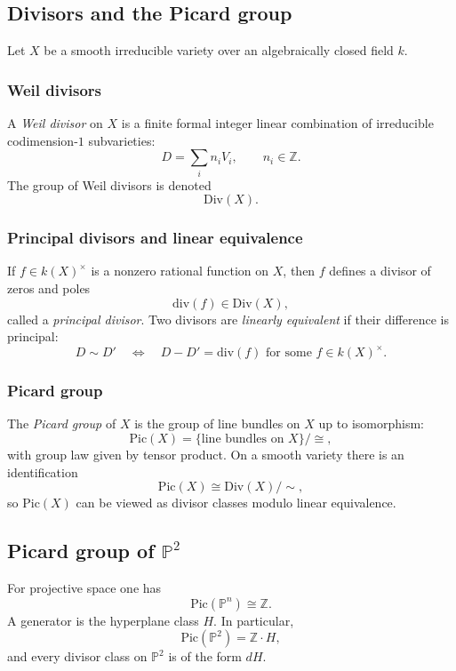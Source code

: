 \documentclass[12pt,a4paper]{article}
\theoremstyle{plain}
\theoremstyle{definition}      %
\begin{document}
\subsection*{Divisors and the Picard group}

Let $X$ be a smooth irreducible variety over an algebraically closed field $k$.

\subsubsection*{Weil divisors}

A \emph{Weil divisor} on $X$ is a finite formal integer linear combination of irreducible codimension-$1$ subvarieties:
\[
D=\sum_i n_i V_i,
\qquad
n_i\in \mathbb Z.
\]
The group of Weil divisors is denoted
\[
\mathrm{Div}(X).
\]

\subsubsection*{Principal divisors and linear equivalence}

If $f\in k(X)^\times$ is a nonzero rational function on $X$, then $f$ defines a divisor of zeros and poles
\[
\mathrm{div}(f)\in \mathrm{Div}(X),
\]
called a \emph{principal divisor}.
Two divisors are \emph{linearly equivalent} if their difference is principal:
\[
D\sim D'
\quad\Longleftrightarrow\quad
D-D'=\mathrm{div}(f)
\text{ for some } f\in k(X)^\times.
\]

\subsubsection*{Picard group}

The \emph{Picard group} of $X$ is the group of line bundles on $X$ up to isomorphism:
\[
\mathrm{Pic}(X)
=
\{\text{line bundles on }X\}/\cong,
\]
with group law given by tensor product.
On a smooth variety there is an identification
\[
\mathrm{Pic}(X)\cong \mathrm{Div}(X)\big/\sim,
\]
so $\mathrm{Pic}(X)$ can be viewed as divisor classes modulo linear equivalence.

\subsection*{Picard group of $\mathbb P^2$}

For projective space one has
\[
\mathrm{Pic}(\mathbb P^n)\cong \mathbb Z.
\]
A generator is the hyperplane class $H$.
In particular,
\[
\mathrm{Pic}(\mathbb P^2)=\mathbb Z\cdot H,
\]
and every divisor class on $\mathbb P^2$ is of the form $dH$.
\end{document}
